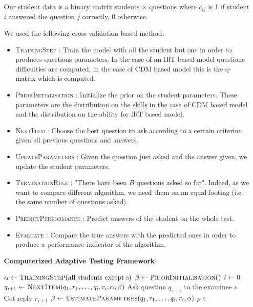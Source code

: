 \documentclass{sig-alternate}
\begin{document}
Our student data is a binary matrix students $\times$ questions where $c_{ij}$ is 1 if student $i$ answered the question $j$ correctly, 0 otherwise. 

We used the following cross-validation based method: 

\begin{itemize}
\item \textsc{TrainingStep} : Train the model with all the student but one in order to produces questions parameters. In the case of an IRT based model questions difficulties are computed, in the case of CDM based model this is the q-matrix which is computed. 
\item \textsc{PriorInitialisation} : Initialize the prior on the student parameters.  These parameters are the distribution on the skills in the case of CDM based model and the distribution on the ability for IRT based model. 
\item \textsc{NextItem} : Choose the best question to ask according to a certain criterion given all previous questions and answers. 
\item \textsc{UpdateParameters} : Given the question just asked and the answer given, we update the student parameters.
\item \textsc{TerminationRule} : "There have been $B$ questions asked so far". Indeed, as we want to compare different algorithm, we need them on an equal footing (i.e. the same number of questions asked). 
\item \textsc{PredictPerformance} : Predict answers of the student on the whole test.
\item \textsc{Evaluate} : Compare the true answers with the predicted ones in order to produce a performance indicator of the algorithm. 
\end{itemize}

\begin{algorithm}
\caption*{\textbf{Computerized Adaptive Testing Framework}}
\begin{algorithmic}
	\State $\alpha \gets \Call{TrainingStep}{\text{all students except s}}$
	\State $\beta \gets \Call{PriorInitialisation}$
	\State $i \gets 0$
		\State $q_{i + 1} \gets \Call{NextItem}{q_1, r_1, \ldots, q_i, r_i, \alpha, \beta}$
		\State Ask question $q_{i + 1}$ to the examinee $s$
		\State Get reply $r_{i + 1}$
		\State $\beta \gets \Call{EstimateParameters}{q_1, r_1, \ldots, q_i, r_i, \alpha}$
	\EndWhile
	\State $p \gets$ 
	\State {}
\EndFor
\EndProcedure
\end{algorithmic}
\end{algorithm}
\end{document}
